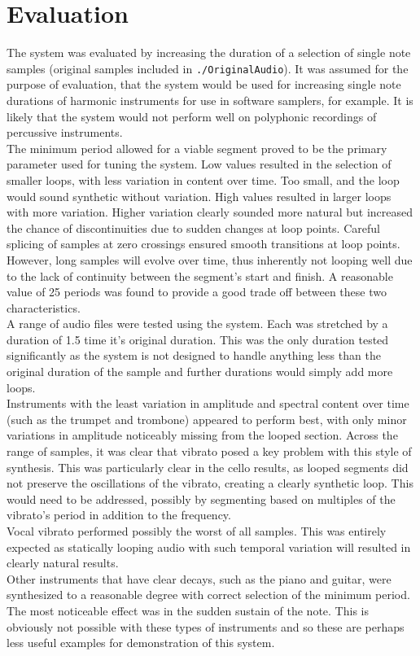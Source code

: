 \documentclass[titlepage]{scrartcl}
\begin{document}
\section{Evaluation}
The system was evaluated by increasing the duration of a selection of single
note samples (original samples included in \texttt{./OriginalAudio}). It was
assumed for the purpose of evaluation, that the system would be used for
increasing single note durations of harmonic instruments for use in software
samplers, for example. It is likely that the system would not perform well on
polyphonic recordings of percussive instruments.\\
The minimum period allowed for a viable segment proved to be the primary
parameter used for tuning the system.  Low values resulted in the selection of
smaller loops, with less variation in content over time. Too small, and the
loop would sound synthetic without variation. High values resulted in larger
loops with more variation. Higher variation clearly sounded more natural but
increased the chance of discontinuities due to sudden changes at loop points.
Careful splicing of samples at zero crossings ensured smooth transitions at
loop points.  However, long samples will evolve over time, thus inherently not
looping well due to the lack of continuity between the segment's start and
finish.  A reasonable value of 25 periods was found to provide a good trade off
between these two characteristics.\\
A range of audio files were tested using the system. Each was stretched by a
duration of 1.5 time it's original duration. This was the only duration tested
significantly as the system is not designed to handle anything less than the
original duration of the sample and further durations would simply add more
loops.\\
Instruments with the least variation in amplitude and spectral content over
time (such as the trumpet and trombone) appeared to perform best, with only
minor variations in amplitude noticeably missing from the looped section.
Across the range of samples, it was clear that vibrato posed a key problem
with this style of synthesis. This was particularly clear in the cello results,
as looped segments did not preserve the oscillations of the vibrato, creating a
clearly synthetic loop. This would need to be addressed, possibly by segmenting
based on multiples of the vibrato's period in addition to the frequency.\\
Vocal vibrato performed possibly the worst of all samples. This was entirely
expected as statically looping audio with such temporal variation will resulted
in clearly natural results.\\
Other instruments that have clear decays, such as the piano and guitar, were
synthesized to a reasonable degree with correct selection of the minimum
period. The most noticeable effect was in the sudden sustain of the note. This
is obviously not possible with these types of instruments and so these are
perhaps less useful examples for demonstration of this system.
\end{document}
